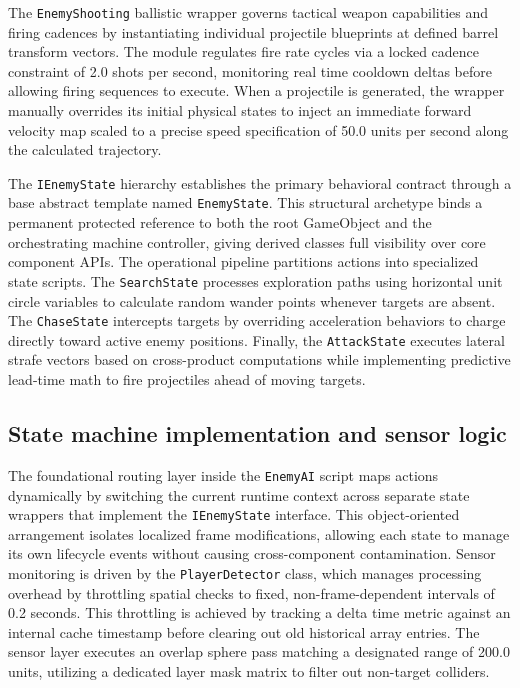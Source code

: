 \documentclass[12pt]{report}
\begin{document}
The \texttt{EnemyShooting} ballistic wrapper governs tactical weapon capabilities and firing cadences by instantiating individual projectile blueprints at defined barrel transform vectors. The module regulates fire rate cycles via a locked cadence constraint of 2.0 shots per second, monitoring real time cooldown deltas before allowing firing sequences to execute. When a projectile is generated, the wrapper manually overrides its initial physical states to inject an immediate forward velocity map scaled to a precise speed specification of 50.0 units per second along the calculated trajectory.

The \texttt{IEnemyState} hierarchy establishes the primary behavioral contract through a base abstract template named \texttt{EnemyState}. This structural archetype binds a permanent protected reference to both the root GameObject and the orchestrating machine controller, giving derived classes full visibility over core component APIs. The operational pipeline partitions actions into specialized state scripts. The \texttt{SearchState} processes exploration paths using horizontal unit circle variables to calculate random wander points whenever targets are absent. The \texttt{ChaseState} intercepts targets by overriding acceleration behaviors to charge directly toward active enemy positions. Finally, the \texttt{AttackState} executes lateral strafe vectors based on cross-product computations while implementing predictive lead-time math to fire projectiles ahead of moving targets.

\subsection{State machine implementation and sensor logic}

The foundational routing layer inside the \texttt{EnemyAI} script maps actions dynamically by switching the current runtime context across separate state wrappers that implement the \texttt{IEnemyState} interface. This object-oriented arrangement isolates localized frame modifications, allowing each state to manage its own lifecycle events without causing cross-component contamination. Sensor monitoring is driven by the \texttt{PlayerDetector} class, which manages processing overhead by throttling spatial checks to fixed, non-frame-dependent intervals of 0.2 seconds. This throttling is achieved by tracking a delta time metric against an internal cache timestamp before clearing out old historical array entries. The sensor layer executes an overlap sphere pass matching a designated range of 200.0 units, utilizing a dedicated layer mask matrix to filter out non-target colliders.
\end{document}

